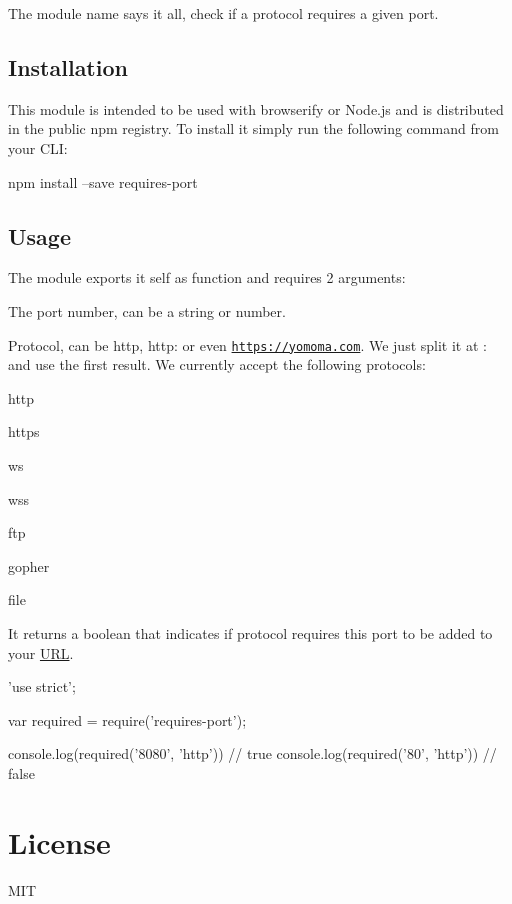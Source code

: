 \href{http://unshift.io}{\tt }\href{http://browsenpm.org/package/requires-port}{\tt }\href{https://travis-ci.org/unshiftio/requires-port}{\tt }\href{https://david-dm.org/unshiftio/requires-port}{\tt }\href{https://coveralls.io/r/unshiftio/requires-port?branch=master}{\tt }\href{http://webchat.freenode.net/?channels=unshift}{\tt }

The module name says it all, check if a protocol requires a given port.

\subsection*{Installation}

This module is intended to be used with browserify or Node.\+js and is distributed in the public npm registry. To install it simply run the following command from your C\+LI\+:


\begin{DoxyCode}
npm install --save requires-port
\end{DoxyCode}


\subsection*{Usage}

The module exports it self as function and requires 2 arguments\+:


\begin{DoxyEnumerate}
\item The port number, can be a string or number.
\item Protocol, can be {\ttfamily http}, {\ttfamily http\+:} or even {\ttfamily \href{https://yomoma.com}{\tt https\+://yomoma.\+com}}. We just split it at {\ttfamily \+:} and use the first result. We currently accept the following protocols\+:
\begin{DoxyItemize}
\item {\ttfamily http}
\item {\ttfamily https}
\item {\ttfamily ws}
\item {\ttfamily wss}
\item {\ttfamily ftp}
\item {\ttfamily gopher}
\item {\ttfamily file}
\end{DoxyItemize}
\end{DoxyEnumerate}

It returns a boolean that indicates if protocol requires this port to be added to your \mbox{\hyperlink{namespace_u_r_l}{U\+RL}}.


\begin{DoxyCode}
'use strict';

var required = require('requires-port');

console.log(required('8080', 'http')) // true
console.log(required('80', 'http'))   // false
\end{DoxyCode}


\section*{License}

M\+IT 